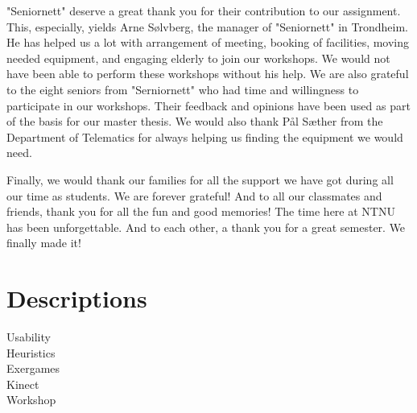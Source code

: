 \documentclass[b5paper,twoside,openright,11pt]{report}
\begin{document}
"Seniornett" deserve a great thank you for their contribution to our assignment. This, especially, yields Arne Sølvberg, the manager of "Seniornett" in Trondheim. He has helped us a lot with arrangement of meeting, booking of facilities, moving needed equipment, and engaging elderly to join our workshops. We would not have been able to perform these workshops without his help. We are also grateful to the eight seniors from "Serniornett" who had time and willingness to participate in our workshops. Their feedback and opinions have been used as part of the basis for our master thesis. We would also thank Pål Sæther from the Department of Telematics for always helping us finding the equipment we would need.        

Finally, we would thank our families for all the support we have got during all our time as students. We are forever grateful! And to all our classmates and friends, thank you for all the fun and good memories! The time here at NTNU has been unforgettable. And to each other, a thank you for a great semester. We finally made it!   

\cleardoublepage
{}
\tableofcontents
\cleardoublepage

\cleardoublepage
\listoffigures
\cleardoublepage
\listoftables
\cleardoublepage
{}
\pagestyle{fancy}
\fancyhead[LE]{\thepage}
\fancyhead[RE]{\leftmark}
\fancyhead[RO]{\thepage}
\fancyhead[LO]{\rightmark}
\fancyfoot{}
\chapter*{Descriptions}
Usability \\
Heuristics \\ 
Exergames \\
Kinect \\ 
Workshop \\

\cleardoublepage

\cleardoublepage

\cleardoublepage

\cleardoublepage

\cleardoublepage

\cleardoublepage

\cleardoublepage

\cleardoublepage

\cleardoublepage

\cleardoublepage

\cleardoublepage

\cleardoublepage

\cleardoublepage

\cleardoublepage


\pagestyle{plain}
\cleardoublepage
\appendix 
  
\cleardoublepage
\end{document}
